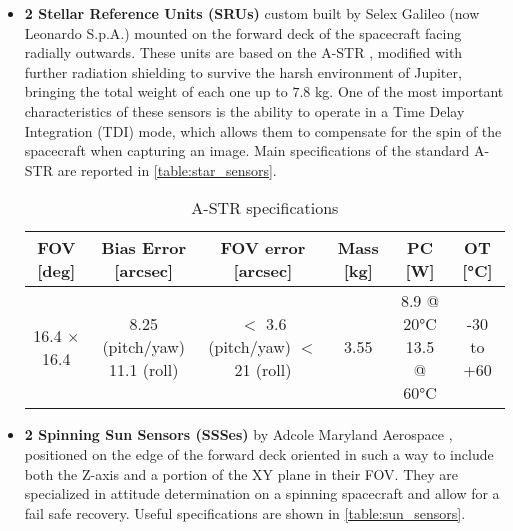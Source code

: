 \begin{itemize}
    \item \textbf{2 Stellar Reference Units (SRUs)} custom built by Selex Galileo (now Leonardo S.p.A.) mounted on the forward deck of the spacecraft facing radially outwards. These units are based on the A-STR \cite{SRU}, modified with further radiation shielding to survive the harsh environment of Jupiter, bringing the total weight of each one up to $7.8$ kg. \cite{SRU_description} 
    One of the most important characteristics of these sensors is the ability to operate in a Time Delay Integration (TDI) mode, which allows them to compensate for the spin of the spacecraft when capturing an image. Main specifications of the standard A-STR are reported in \autoref{table:star_sensors}.
    \begin{table}[H]
        \renewcommand{\arraystretch}{1.3}
        \centering
        \small
        \begin{tabular}{|c|c|c|c|c|c|}
            \hline
            \textbf{FOV [deg]} & \textbf{Bias Error [arcsec]} & \textbf{FOV error [arcsec]} & \textbf{Mass [kg]} & \textbf{PC [W]} & \textbf{OT [°C]} \\
            \hline
            \hline
            16.4 $\times$ 16.4 & \makecell{8.25 (pitch/yaw) \\ 11.1 (roll)} & \makecell{$<$ 3.6 (pitch/yaw) \\ $<$ 21 (roll)} &
            3.55 & \makecell{8.9 @ 20°C \\ 13.5 @ 60°C} & -30 to +60\\
            \hline
        \end{tabular}
        \caption{A-STR specifications}
        \label{table:star_sensors}
    \end{table}
    \vspace*{-3mm}

    \item \textbf{2 Spinning Sun Sensors (SSSes)} by Adcole Maryland Aerospace \cite{SSS}, positioned on the edge of the forward deck oriented in such a way to include both the Z-axis and a portion of the XY plane in their FOV. They are specialized in attitude determination on a spinning spacecraft and allow for a fail safe recovery. Useful specifications are shown in \autoref{table:sun_sensors}.
    

\end{itemize}
